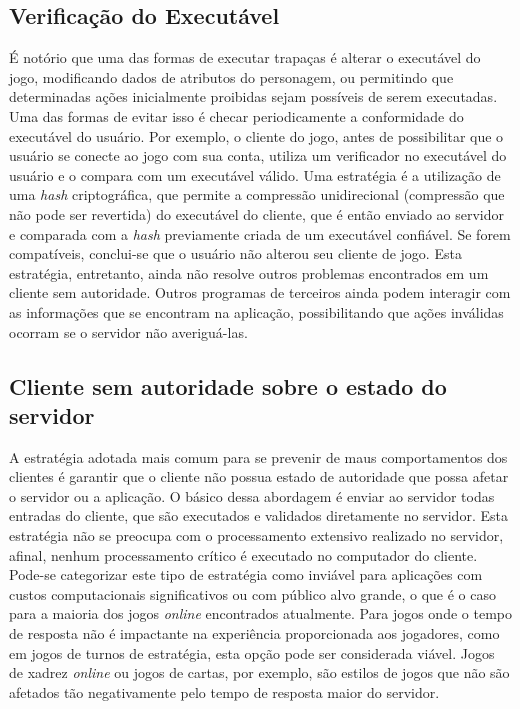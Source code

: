\subsection{Verificação do Executável}
É notório que uma das formas de executar trapaças é alterar o executável do jogo, modificando dados de atributos do personagem, ou permitindo que determinadas ações inicialmente proibidas sejam possíveis de serem executadas. 
Uma das formas de evitar isso é checar periodicamente a conformidade do executável do usuário. Por exemplo, o cliente do jogo, antes de possibilitar que o usuário se conecte ao jogo com sua conta, utiliza um verificador no executável do usuário e o compara com um executável válido. Uma estratégia é a utilização de uma \textit{hash} criptográfica, que permite a compressão unidirecional (compressão que não pode ser revertida) do executável do cliente, que é então enviado ao servidor e comparada com a \textit{hash} previamente criada de um executável confiável. Se forem compatíveis, conclui-se que o usuário não alterou seu cliente de jogo. Esta estratégia, entretanto, ainda não resolve outros problemas encontrados em um cliente sem autoridade. Outros programas de terceiros ainda podem interagir com as informações que se encontram na aplicação, possibilitando que ações inválidas ocorram se o servidor não averiguá-las. 


\subsection{Cliente sem autoridade sobre o estado do servidor}
A estratégia adotada mais comum para se prevenir de maus comportamentos dos clientes é garantir que o cliente não possua estado de autoridade que possa afetar o servidor ou a aplicação. O básico dessa abordagem é enviar ao servidor todas entradas do cliente, que são executados e validados diretamente no servidor. Esta estratégia não se preocupa com o processamento extensivo realizado no servidor, afinal, nenhum processamento crítico é executado no computador do cliente. Pode-se categorizar este tipo de estratégia como inviável para aplicações com custos computacionais significativos ou com público alvo grande, o que é o caso para a maioria dos jogos \textit{online} encontrados atualmente. Para jogos onde o tempo de resposta não é impactante na experiência proporcionada aos jogadores, como em jogos de turnos de estratégia, esta opção pode ser considerada viável. Jogos de xadrez \textit{online} ou jogos de cartas, por exemplo, são estilos de jogos que não são afetados tão negativamente pelo tempo de resposta maior do servidor. 

